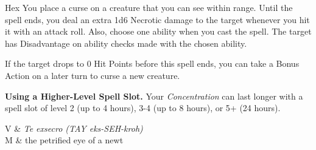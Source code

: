 \begin{Spell}[
  tags=Concentration,
  level=1st,
  time=1 Bonus Action,
  range=90 ft,
  components={V, S, M},
  duration=1 Hour,
  school=Enchantment,
  attack=None,
  effect=Necrotic
]{Hex}
You place a curse on a creature that you can see within range. Until the spell ends, you deal an extra 1d6 Necrotic damage to the target whenever you hit it with an attack roll. Also, choose one ability when you cast the spell. The target has Disadvantage on ability checks made with the chosen ability.

If the target drops to 0 Hit Points before this spell ends, you can take a Bonus Action on a later turn to curse a new creature.

\textbf{Using a Higher-Level Spell Slot.} Your \textit{Concentration} can last longer with a spell slot of level 2 (up to 4 hours), 3-4 (up to 8 hours), or 5+ (24 hours).

\begin{components}
V & \textit{Te exsecro (TAY eks-SEH-kroh)} \\
M & the petrified eye of a newt
\end{components}
\end{Spell}


